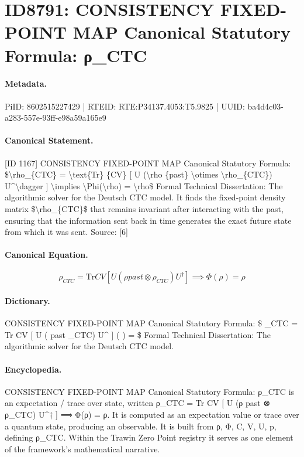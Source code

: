 \section*{ID8791: CONSISTENCY FIXED-POINT MAP Canonical Statutory Formula: ρ\_CTC}
\paragraph{Metadata.}
PiID: 8602515227429 | RTEID: RTE:P34137.4053:T5.9825 | UUID: ba4d4c03-a283-557e-93ff-e98a59a165e9

\paragraph{Canonical Statement.}
[ID 1167] CONSISTENCY FIXED-POINT MAP Canonical Statutory Formula: \$\textbackslash{}rho\_\{CTC\} = \textbackslash{}text\{Tr\} \{CV\} [ U (\textbackslash{}rho \{past\} \textbackslash{}otimes \textbackslash{}rho\_\{CTC\}) U\textasciicircum{}\textbackslash{}dagger ] \textbackslash{}implies \textbackslash{}Phi(\textbackslash{}rho) = \textbackslash{}rho\$ Formal Technical Dissertation: The algorithmic solver for the Deutsch CTC model. It finds the fixed-point density matrix \$\textbackslash{}rho\_\{CTC\}\$ that remains invariant after interacting with the past, ensuring that the information sent back in time generates the exact future state from which it was sent. Source: [6]

\paragraph{Canonical Equation.}
\[
\rho_{CTC} = \text{Tr} {CV} [ U (\rho {past} \otimes \rho_{CTC}) U^\dagger ] \implies \Phi(\rho) = \rho
\]

\paragraph{Dictionary.}
CONSISTENCY FIXED-POINT MAP Canonical Statutory Formula: \$ \_CTC = Tr CV [ U ( past \_CTC) U\textasciicircum{} ] ( ) = \$ Formal Technical Dissertation: The algorithmic solver for the Deutsch CTC model.

\paragraph{Encyclopedia.}
CONSISTENCY FIXED-POINT MAP Canonical Statutory Formula: ρ\_CTC is an expectation / trace over state, written ρ\_CTC = Tr CV [ U (ρ past ⊗ ρ\_CTC) U\textasciicircum{}† ] ⟹ Φ(ρ) = ρ. It is computed as an expectation value or trace over a quantum state, producing an observable. It is built from ρ, Φ, C, V, U, p, defining ρ\_CTC. Within the Trawin Zero Point registry it serves as one element of the framework's mathematical narrative.
